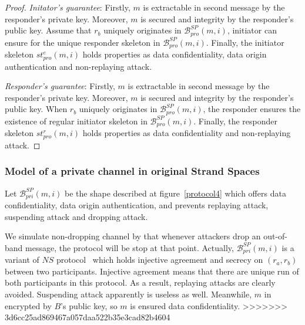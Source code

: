 \begin{proof}
\emph{Initator's guarantee}: Firstly, $m$ is extractable in second message by the responder's private key. Moreover, $m$ is secured and integrity by the responder's public key. Assume that $r_b$ uniquely originates in $\mathcal{B}^{SP}_{pro}(m,i)$, initiator can ensure for the unique responder skeleton in $\mathcal{B}^{SP}_{pro}(m,i)$. Finally, the initiator skeleton $st^e_{pro}(m,i)$ holds properties as data confidentiality, data origin authentication and non-replaying attack.

\emph{Responder's guarantee}: Firstly, $m$ is extractable in second message by the responder's private key. Moreover, $m$ is secured and integrity by the responder's public key. When $r_b$ uniquely originates in $\mathcal{B}^{SP}_{pro}(m,i)$, the responder ensures the existence of regular initiator skeleton in $\mathcal{B}^{SP}_{pro}(m,i)$. Finally, the responder skeleton $st^r_{pro}(m,i)$ holds properties as data confidentiality and non-replaying attack.
 \end{proof}

\subsubsection*{Model of a private channel in original Strand Spaces}\label{private}

Let $\mathcal{B}^{SP}_{pri}(m,i)$ be the shape described at figure~\ref{protocol4} which offers data confidentiality, data origin authentication, and prevents replaying attack, suspending attack and dropping attack.

We simulate non-dropping channel by that whenever attackers drop an out-of-band message, the protocol will be stop at that point. Actually, $\mathcal{B}^{SP}_{pri}(m,i)$ is a variant of $NS$ protocol~\cite{674832} which holds injective agreement and secrecy on $(r_a,r_b)$ between two participants. Injective agreement means that there are unique run of both participants in this protocol. As a result, replaying attacks are clearly avoided. Suspending attack apparently is useless as well. Meanwhile, $m$ in encrypted by $B$'s public key, so $m$ is ensured data confidentiality. 
>>>>>>> 3d6cc25ad869467a057daa522b35e3cad82b4604

